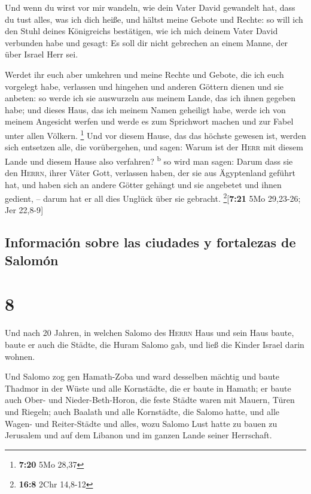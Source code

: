  Und wenn du wirst vor mir wandeln, wie dein Vater David
gewandelt hat, dass du tust alles, was ich dich heiße, und hältst meine
Gebote und Rechte:  so will ich den Stuhl deines
Königreichs bestätigen, wie ich mich deinem Vater David verbunden habe
und gesagt: Es soll dir nicht gebrechen an einem Manne, der über Israel
Herr sei.

 Werdet ihr euch aber umkehren und meine Rechte und
Gebote, die ich euch vorgelegt habe, verlassen und hingehen und anderen
Göttern dienen und sie anbeten:  so werde ich sie
auswurzeln aus meinem Lande, das ich ihnen gegeben habe; und dieses
Haus, das ich meinem Namen geheiligt habe, werde ich von meinem
Angesicht werfen und werde es zum Sprichwort machen und zur Fabel unter
allen Völkern. \footnote{\textbf{7:20} 5Mo 28,37}  Und
vor diesem Hause, das das höchste gewesen ist, werden sich entsetzen
alle, die vorübergehen, und sagen: Warum ist der \textsc{Herr} mit
diesem Lande und diesem Hause also verfahren? \textsuperscript{b}
 so wird man sagen: Darum dass sie den \textsc{Herrn},
ihrer Väter Gott, verlassen haben, der sie aus Ägyptenland geführt hat,
und haben sich an andere Götter gehängt und sie angebetet und ihnen
gedient, -- darum hat er all dies Unglück über sie gebracht.
\footnote{\textbf{16:8} 2Chr 14,8-12}{[}\textbf{7:21} 5Mo 29,23-26; Jer
22,8-9{]}

\hypertarget{informaciuxf3n-sobre-las-ciudades-y-fortalezas-de-salomuxf3n}{%
\subsection{Información sobre las ciudades y fortalezas de
Salomón}\label{informaciuxf3n-sobre-las-ciudades-y-fortalezas-de-salomuxf3n}}

\hypertarget{section-7}{%
\section{8}\label{section-7}}

 Und nach 20 Jahren, in welchen Salomo des \textsc{Herrn}
Haus und sein Haus baute,  baute er auch die Städte, die
Huram Salomo gab, und ließ die Kinder Israel darin wohnen.

 Und Salomo zog gen Hamath-Zoba und ward desselben mächtig
 und baute Thadmor in der Wüste und alle Kornstädte, die
er baute in Hamath;  er baute auch Ober- und
Nieder-Beth-Horon, die feste Städte waren mit Mauern, Türen und Riegeln;
 auch Baalath und alle Kornstädte, die Salomo hatte, und
alle Wagen- und Reiter-Städte und alles, wozu Salomo Lust hatte zu bauen
zu Jerusalem und auf dem Libanon und im ganzen Lande seiner Herrschaft.

